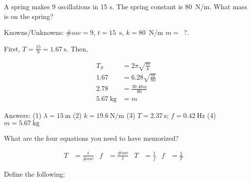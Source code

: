 \documentclass[10pt]{exam}
\begin{document}
\begin{questions}
\begin{solution}[\stretch{1}]
  \end{solution}

\question
  A spring makes 9 oscillations in 15 s. The spring constant is 80~N/m.  What mass is on the spring?
  
  \begin{solution}[\stretch{1}]
    Knowns/Unknowns: $\#osc=9$, $t=15$~s, $k=80$~N/m $m=$~?.
    
    First, $T = \frac{15}{9} = \SI{1.67}{\second}$.  Then,
    
    \begin{align*} 
      T_S  &= 2\pi \sqrt{\frac{m}{k}} \\
      1.67 &= 6.28 \sqrt{\frac{m}{80}}\\
      2.78 &= \frac{39.48m}{80} \\
      \SI{5.67}{\kilo\gram} &= m
    \end{align*}
  \end{solution}

\ifprintanswers
\else
  \begin{EnvUplevel}
    \noindent
    {\small Answers: 
      (1) $\lambda=\SI{15}{\meter}$ 
      (2) $k=\SI{19.6}{\newton\per\meter}$ 
      (3) $T=\SI{2.37}{\second}$; $f=\SI{0.42}{\hertz}$
      (4) $m=\SI{5.67}{\kilo\gram}$
    }
  \end{EnvUplevel}
\fi

\pagebreak

\question
  What are the four equations you need to have memorized?

  \begin{solution}[\stretch{2}]
    \begin{align*}
      T &= \frac{t}{\#osc} &
      f &= \frac{\#osc}{t} &
      T &= \frac{1}{f} &
      f &= \frac{1}{T} &
    \end{align*}
  \end{solution}

\question
  Define the following:

\end{questions}
\end{document}
